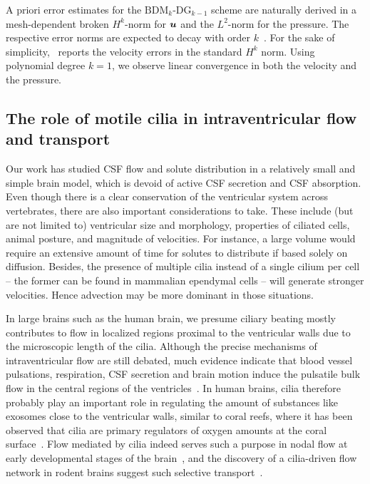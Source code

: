 \documentclass{WileyMSP-template}
\begin{document}
A priori error estimates for the $\mathrm{BDM}_k$-$\mathrm{DG}_{k-1}$ scheme are naturally 
derived in a mesh-dependent broken $H^k$-norm for $\bm{u}$ and the $L^2$-norm for the pressure.
The respective error norms are expected to decay with order $k$~\cite{Cockburn2005AEquations}.
For the sake of simplicity,~
reports the velocity errors in the standard $H^k$ norm. Using polynomial degree  
$k=1$, we observe linear convergence in both the velocity and the pressure.   

\subsection{The role of motile cilia in intraventricular flow and transport}
Our work has studied CSF flow and solute distribution
in a relatively small and simple brain model, which is devoid of
active CSF secretion and CSF absorption. Even though there is
a clear conservation of the ventricular system across vertebrates,
there are also important considerations to take. These include (but are not limited to)
ventricular size and morphology, properties of ciliated cells,
animal posture, and magnitude of velocities. For instance, a large
volume would require an extensive amount of time for solutes to distribute
if based solely on diffusion. Besides, the presence of multiple cilia
instead of a single cilium per cell -- the former can be found in
mammalian ependymal cells -- will generate stronger velocities.
Hence advection may be more dominant in those situations.

In large brains such as the human brain, we presume ciliary beating mostly 
contributes to flow in localized regions proximal to the ventricular walls due to
the microscopic length of the cilia.
Although the precise mechanisms of intraventricular flow are still debated,
much evidence indicate that blood vessel pulsations, respiration, CSF secretion
and brain motion induce the pulsatile bulk flow in the central
regions of the ventricles~\cite{Vinje2019RespiratoryMeasurements,
Siyahhan2014FlowVentricles, Linninger2005PulsatileBrain, Enzmann1992BrainImaging,
Kurtcuoglu2007ComputationalSylvius}.
In human brains, cilia therefore probably play an important role in regulating the
amount of substances like exosomes close to the ventricular walls, similar to coral
reefs, where it has been observed that cilia are primary regulators of
oxygen amounts at the coral surface~\cite{Pacherres2022CiliaryProduction}.
Flow mediated by cilia indeed serves such a purpose in nodal flow at early
developmental stages of the brain~\cite{Hirokawa2006NodalAsymmetry}, and the discovery
of a cilia-driven flow network in rodent brains suggest such selective
transport~\cite{Faubel2016Cilia-basedVentricles}.
\end{document}
